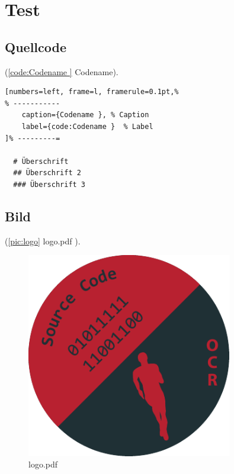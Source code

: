 
\hypertarget{test}{%
\section{Test}\label{test}}

\hypertarget{quellcode}{%
\subsection{Quellcode}\label{quellcode}}

(\autoref{code:Codename } Codename). %

\lstset{language=Bash} %
\begin{lstlisting}[numbers=left, frame=l, framerule=0.1pt,%
% -----------
	caption={Codename }, % Caption
	label={code:Codename }  % Label
]% ---------=

  # Überschrift
  ## Überschrift 2
  ### Überschrift 3
\end{lstlisting}

\hypertarget{bild}{%
\subsection{Bild}\label{bild}}

(\autoref{pic:logo} logo.pdf ). %

\begin{figure}[!hp]%
	\centering
	\includegraphics[width=0.8\textwidth]{img/logo.pdf}
	\caption[logo.pdf ]{logo.pdf } %
	\label{pic:logo}	%
\end{figure}

